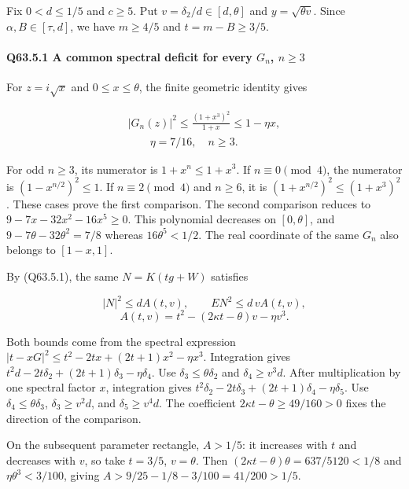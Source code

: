Fix $0<\allowbreak d\le\allowbreak 1/5$ and $c\ge\allowbreak 5$. Put $v=\allowbreak \delta_2/d\in[d,\allowbreak  \theta]$ and $y=\allowbreak \sqrt{\theta v}$.
Since $\alpha,\allowbreak  B\in[\tau,\allowbreak  d]$, we have $m\ge\allowbreak 4/5$ and $t=\allowbreak m-B\ge\allowbreak 3/5$.

\paragraph{Q63.5.1 A common spectral deficit for every $G_n$, $n\ge\allowbreak 3$}

For $z=\allowbreak i\sqrt{x}$ and $0\le\allowbreak  x\le\allowbreak \theta$, the finite geometric identity gives

\[
\begin{gathered}
|G_n(z)|^2\le\frac{(1+x^3)^2}{1+x}\le1-\eta x,\\
\qquad\eta=7/16,\quad n\ge3.
\end{gathered}\tag{Q63.5.1}\label{eq:Q63:Q63:5:1}
\]

For odd $n\ge\allowbreak 3$, its numerator is $1+x^n\le\allowbreak 1+x^3$. If $n\equiv0\pmod4$, the numerator is $(1-x^{n/2})^2\le\allowbreak 1$.
If $n\equiv2\pmod4$ and $n\ge\allowbreak 6$, it is $(1+x^{n/2})^2\le\allowbreak (1+x^3)^2$. These cases prove the first comparison.
The second comparison reduces to $9-7x-32x^2-16x^5\ge\allowbreak 0$. This polynomial decreases on $[0,\allowbreak  \theta]$,
and $9-7\theta-32\theta^2=\allowbreak 7/8$ whereas $16\theta^5<\allowbreak 1/2$.
The real coordinate of the same $G_n$ also belongs to $[1-x,\allowbreak  1]$.

By (Q63.5.1), the same $N=\allowbreak K(tg+W)$ satisfies

\[
|N|^2\le d A(t,v),\qquad EN^2\le d\,v A(t,v),
\]
\[
A(t,v)=t^2-(2\kappa t-\theta)v-\eta v^3.
\tag{Q63.5.2}\label{eq:Q63:Q63:5:2}
\]

Both bounds come from the spectral expression
\(|t-xG|^2\le\allowbreak  t^2-2tx+(2t+1)x^2-\eta x^3\).
Integration gives $t^2d-2t\delta_2+(2t+1)\delta_3-\eta \delta_4$. Use $\delta_3\le\allowbreak \theta \delta_2$ and $\delta_4\ge\allowbreak  v^3d$.
After multiplication by one spectral factor $x$, integration gives $t^2\delta_2-2t\delta_3+(2t+1)\delta_4-\eta \delta_5$. Use $\delta_4\le\allowbreak \theta \delta_3$,
$\delta_3\ge\allowbreak  v^2d$, and $\delta_5\ge\allowbreak  v^4d$. The coefficient $2\kappa t-\theta\ge\allowbreak 49/160>\allowbreak 0$ fixes the direction of the comparison.

On the subsequent parameter rectangle, $A>\allowbreak 1/5$: it increases with $t$ and decreases with $v$, so take $t=\allowbreak 3/5$, $v=\allowbreak \theta$.
Then $(2\kappa t-\theta)\theta=\allowbreak 637/5120<\allowbreak 1/8$ and $\eta\theta^3<\allowbreak 3/100$,
giving $A>\allowbreak 9/25-1/8-3/100=\allowbreak 41/200>\allowbreak 1/5$.

